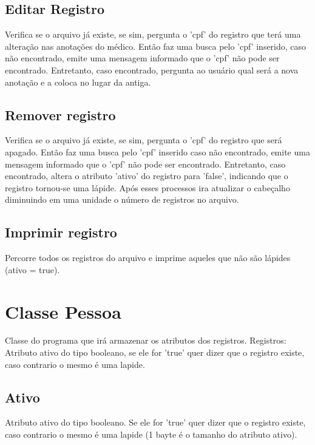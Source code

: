 \subsection{\esp Editar Registro}
 
Verifica se o arquivo já existe, se sim, pergunta o 'cpf' do registro que terá uma alteração nas anotações do médico. Então faz uma busca pelo 'cpf' inserido, caso não encontrado, emite uma mensagem informado que o 'cpf' não pode ser encontrado. Entretanto, caso encontrado, pergunta ao usuário qual será a nova anotação e a coloca no lugar da antiga.
 
 \subsection{\esp Remover registro}
 
 
 Verifica se o arquivo já existe, se sim, pergunta o 'cpf' do registro que será apagado. Então faz uma busca pelo 'cpf' inserido caso não encontrado, emite uma mensagem informado que o 'cpf' não pode ser encontrado. Entretanto, caso encontrado, altera o atributo 'ativo' do registro para 'false', indicando que o registro tornou-se uma lápide. Após esses processos ira atualizar o cabeçalho diminuindo em uma unidade o número de registros no arquivo.
 
 
 
 \subsection{\esp Imprimir registro}

Percorre todos os registros do arquivo e imprime aqueles que não são lápides (ativo = true).


\section{\esp Classe Pessoa}

Classe do programa que irá armazenar os atributos dos registros.
Registros: Atributo ativo do tipo booleano, se ele for 'true' quer dizer que o registro existe, caso contrario o mesmo é uma lapide.

\subsection{\esp Ativo}


Atributo ativo do tipo booleano. Se ele for 'true' quer dizer que o registro existe, caso contrario o mesmo é uma lapide (1 bayte é o tamanho do atributo ativo).


